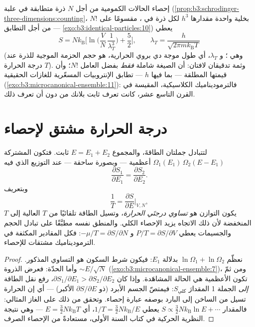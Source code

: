 \begin{proposition}\label{prop:b3:microcanonical-ensemble:gas}
إحصاء الحالات الكمومية من أجل $N$ ذرة متطابقة في علبة
(\cref{prop:b3:schrodinger-three-dimensions:counting}، بخلية واحدة
مقدارها $h^3$ لكل ذرة في ، مقسومًا على $N!$ من أجل التطابق ---
\cref{exo:b3:identical-particles:10}) يعطي
\[
S = Nk_{\text{B}}\Big[\ln\Big(\frac VN\,\frac1{\lambda_T^3}\Big)
 + \frac52\Big] , \qquad
\lambda_T = \frac{h}{\sqrt{2\pi mk_{\text{B}}T}}
\]
(وهي \emph{}؛ و $\lambda_T$، أي طول موجة دي
بروي الحرارية، هو حجم الحزمة الموجية للذرة عند درجة
الحرارة $T$). وثمة تدقيقان لافتان: أن الصيغة شاملة
\emph{فقط} بفضل العامل $N!$؛ وأن قيمتها المطلقة --- بما فيها
$h$ --- تطابق الإنتروبيات المسعّرية للغازات الحقيقية
(\cref{exo:b3:microcanonical-ensemble:11}): فالترموديناميك
الكلاسيكية، المقيسة في القرن التاسع عشر، كانت تعرف
ثابت بلانك من دون أن تعرف ذلك.
\end{proposition}
\admitted

\section{درجة الحرارة مشتق لإحصاء}

\begin{theorem}\label{thm:b3:microcanonical-ensemble:temperature}
لتتبادل جملتان الطاقةَ، والمجموع $E = E_1 + E_2$ ثابت.
فتكون  المشتركة $\Omega_1(E_1)\,\Omega_2(E - E_1)$
أعظمية --- وبصورة ساحقة --- عند التوزيع الذي فيه
\[
\frac{\partial S_1}{\partial E_1} =
\frac{\partial S_2}{\partial E_2} .
\]
وبتعريف
\[
\frac1T = \frac{\partial S}{\partial E}\bigg|_{V,N} ,
\]
يكون التوازن هو \emph{تساوي درجتَي الحرارة}، وتسيل الطاقة
تلقائيًا من $T$ العالية إلى $T$ المنخفضة لأن ذلك الاتجاه
يزيد الإحصاء الكلي. والمنطق نفسه مطبَّقًا على تبادل الحجم
والجسيمات يعطي $P/T = \partial S/\partial V$ و $-\mu/T
= \partial S/\partial N$: فكل المقادير المكثفة في
الترموديناميك مشتقات للإحصاء.
\end{theorem}

\begin{proof}
نعظّم $\ln\Omega_1 + \ln\Omega_2$ بدلالة $E_1$: فيكون شرط
السكون هو التساوي المذكور. وأما الحدّة: فعرض الذروة
$\sim E/\sqrt N$ (\cref{exo:b3:microcanonical-ensemble:7})، ومن ثمّ
تكون الأعظمية هي الحالة المشاهَدة. وإذا كان $\partial S_1/\partial E_1 >
\partial S_2/\partial E_2$، رفع نقل الطاقة \emph{إلى} الجملة 1
المقدارَ $S_{\text{كلي}}$: فيمتصّ الجسم الأبرد (ذو $\partial S/\partial E$
الأكبر) --- أي إن الحرارة تسيل من الساخن إلى البارد بوصفه عبارة إحصاء. وتحقق
من ذلك على الغاز المثالي: فالمقدار $S \propto \tfrac32 Nk_{\text{B}}\ln E + \cdots$
يعطي $1/T = \tfrac32 Nk_{\text{B}}/E$، أي $E = \tfrac32
Nk_{\text{B}}T$ --- وهي نتيجة النظرية الحركية في كتاب السنة الأولى،
مستعادةً من الإحصاء الصرف.
\end{proof}

